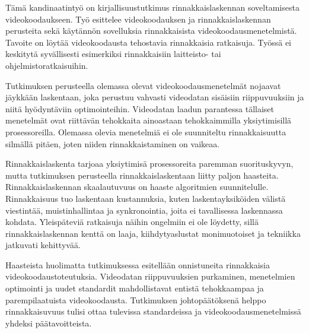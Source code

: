 \begin{fiabstract}

Tämä kandinaatintyö on kirjallisuustutkimus rinnakkaislaskennan soveltamisesta
videokoodaukseen. Työ esittelee videokoodauksen ja rinnakkaislaskennan
perusteita sekä käytännön sovelluksia rinnakkaisista videokoodausmenetelmistä.
Tavoite on löytää videokoodausta tehostavia rinnakkaisia ratkaisuja. Työssä
ei keskitytä syvällisesti esimerkiksi rinnakkaisiin laitteisto- tai
ohjelmistoratkaisuihin.

Tutkimuksen perusteella olemassa olevat videokoodausmenetelmät nojaavat
jäykkään laskentaan, joka perustuu vahvasti videodatan sisäisiin riippuvuuksiin
ja niitä hyödyntäviin optimointeihin. Videodatan laadun parantessa tällaiset
menetelmät ovat riittävän tehokkaita ainoastaan tehokkaimmilla yksiytimisillä
prosessoreilla. Olemassa olevia menetelmiä ei ole suunniteltu rinnakkaisuutta
silmällä pitäen, joten niiden rinnakkaistaminen on vaikeaa.

Rinnakkaislaskenta tarjoaa yksiytimisä prosessoreita paremman suorituskyvyn,
mutta tutkimuksen perusteella rinnakkaislaskentaan liitty paljon haasteita.
Rinnakkaislaskennan skaalautuvuus on haaste algoritmien suunnitelulle.
Rinnakkaisuus tuo laskentaan kustannuksia, kuten laskentayksiköiden välistä
viestintää, muistinhallintaa ja synkronointia, joita ei tavallisessa
laskennassa kohdata. Yleispäteviä ratkaisuja näihin ongelmiin ei ole löydetty,
sillä rinnakkaislaskennan kenttä on laaja, kiihdytyaslustat monimuotoiset ja
tekniikka jatkuvati kehittyvää.

Haasteista huolimatta tutkimuksessa esitellään onnistuneita rinnakkaisia
videokoodaustoteutuksia. Videodatan riippuvuuksien purkaminen, menetelmien
optimointi ja uudet standardit mahdollistavat entistä tehokkaampaa ja
parempilaatuista videokoodausta. Tutkimuksen johtopäätöksenä helppo 
rinnakkaisuvuus tulisi ottaa tulevissa standardeissa ja
videokoodausmenetelmissä yhdeksi päätavoitteista.

\begin{comment}
Tämä kandinaatintyö käsittelee videokoodausmenetelmien rinnakkaislaskennallisia
toteutuksia. Työn tavoitteena on osoittaa, että rinnakkaislaskentaa
hyödyntämällä voidaan toteuttaa perinteisiä menetelmiä tehokkaampaa videon
pakkaamista ja purkamista rinnakkaisohjelmoinnin ongelmista huolimatta.
Käsittely keskittyy rinnakkaislaskennasta saatavaan
laskentatehon kasvuun eikä esimerkiksi rinnakkaisen laskennan oikeellisuuteen
tai sen järjestämiseen. Videokoodausmenetelmiä käsitellään hyvin yleisellä
tasolla menemättä yksittäisten standardien toteutuksiin tarkemmin.


\end{comment}
\end{fiabstract}

